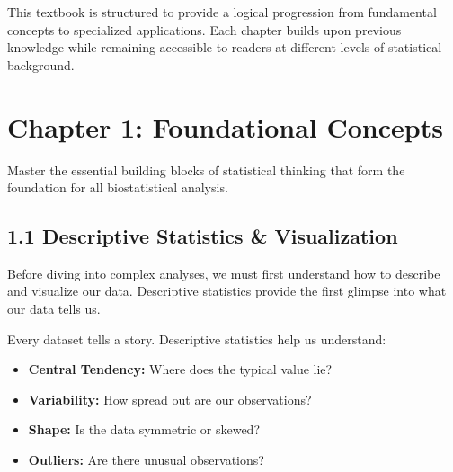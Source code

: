 \documentclass[
  11pt,
  letterpaper,
  oneside]{book}
\providecommand{\tightlist}{%
  \setlength{\itemsep}{0pt}\setlength{\parskip}{0pt}}\usepackage{longtable,booktabs,array}
\begin{document}
This textbook is structured to provide a logical progression from
fundamental concepts to specialized applications. Each chapter builds
upon previous knowledge while remaining accessible to readers at
different levels of statistical background.


\chapter{Chapter 1: Foundational
Concepts}\label{chapter-1-foundational-concepts}

Master the essential building blocks of statistical thinking that form
the foundation for all biostatistical analysis.

\section{1.1 Descriptive Statistics \&
Visualization}\label{descriptive-statistics-visualization}

Before diving into complex analyses, we must first understand how to
describe and visualize our data. Descriptive statistics provide the
first glimpse into what our data tells us.

\begin{tcolorbox}[enhanced jigsaw, opacityback=0, opacitybacktitle=0.6, colbacktitle=quarto-callout-note-color!10!white, toptitle=1mm, colframe=quarto-callout-note-color-frame, breakable, leftrule=.75mm, left=2mm, titlerule=0mm, bottomtitle=1mm, colback=white, title=\textcolor{quarto-callout-note-color}{\faInfo}\hspace{0.5em}{Understanding Your Data}, rightrule=.15mm, coltitle=black, arc=.35mm, bottomrule=.15mm, toprule=.15mm]

Every dataset tells a story. Descriptive statistics help us understand:

\begin{itemize}
\tightlist
\item
  \textbf{Central Tendency:} Where does the typical value lie?
\item
  \textbf{Variability:} How spread out are our observations?
\item
  \textbf{Shape:} Is the data symmetric or skewed?
\item
  \textbf{Outliers:} Are there unusual observations?
\end{itemize}

\end{tcolorbox}
\end{document}
